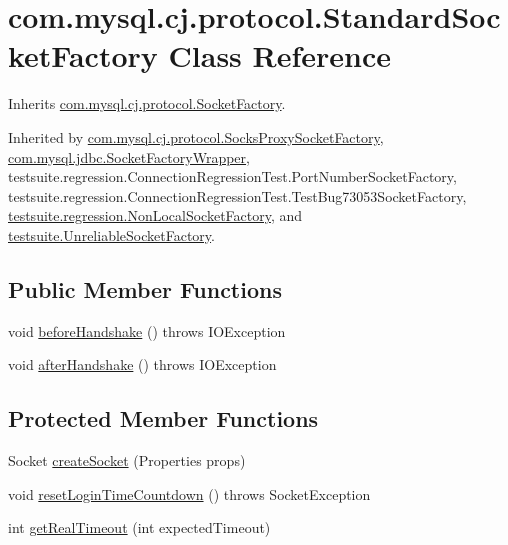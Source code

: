 \hypertarget{classcom_1_1mysql_1_1cj_1_1protocol_1_1_standard_socket_factory}{}\section{com.\+mysql.\+cj.\+protocol.\+Standard\+Socket\+Factory Class Reference}
\label{classcom_1_1mysql_1_1cj_1_1protocol_1_1_standard_socket_factory}


Inherits \mbox{\hyperlink{interfacecom_1_1mysql_1_1cj_1_1protocol_1_1_socket_factory}{com.\+mysql.\+cj.\+protocol.\+Socket\+Factory}}.



Inherited by \mbox{\hyperlink{classcom_1_1mysql_1_1cj_1_1protocol_1_1_socks_proxy_socket_factory}{com.\+mysql.\+cj.\+protocol.\+Socks\+Proxy\+Socket\+Factory}}, \mbox{\hyperlink{classcom_1_1mysql_1_1jdbc_1_1_socket_factory_wrapper}{com.\+mysql.\+jdbc.\+Socket\+Factory\+Wrapper}}, testsuite.\+regression.\+Connection\+Regression\+Test.\+Port\+Number\+Socket\+Factory, testsuite.\+regression.\+Connection\+Regression\+Test.\+Test\+Bug73053\+Socket\+Factory, \mbox{\hyperlink{classtestsuite_1_1regression_1_1_non_local_socket_factory}{testsuite.\+regression.\+Non\+Local\+Socket\+Factory}}, and \mbox{\hyperlink{classtestsuite_1_1_unreliable_socket_factory}{testsuite.\+Unreliable\+Socket\+Factory}}.

\subsection*{Public Member Functions}
\begin{DoxyCompactItemize}
\item 
void \mbox{\hyperlink{classcom_1_1mysql_1_1cj_1_1protocol_1_1_standard_socket_factory_a4e13a5c155c986e139058ab3933017fe}{before\+Handshake}} ()  throws I\+O\+Exception 
\item 
void \mbox{\hyperlink{classcom_1_1mysql_1_1cj_1_1protocol_1_1_standard_socket_factory_a3d55f3b14d5d46d75ab93c88a339a72a}{after\+Handshake}} ()  throws I\+O\+Exception 
\end{DoxyCompactItemize}
\subsection*{Protected Member Functions}
\begin{DoxyCompactItemize}
\item 
Socket \mbox{\hyperlink{classcom_1_1mysql_1_1cj_1_1protocol_1_1_standard_socket_factory_a439fda55f4c2b8c5af6dd2eff89b45ae}{create\+Socket}} (Properties props)
\item 
void \mbox{\hyperlink{classcom_1_1mysql_1_1cj_1_1protocol_1_1_standard_socket_factory_a204052d6c208e52dd0d833dba77a7060}{reset\+Login\+Time\+Countdown}} ()  throws Socket\+Exception 
\item 
int \mbox{\hyperlink{classcom_1_1mysql_1_1cj_1_1protocol_1_1_standard_socket_factory_a175915453d16906ae2af7bdcbae4210f}{get\+Real\+Timeout}} (int expected\+Timeout)
\end{DoxyCompactItemize}
